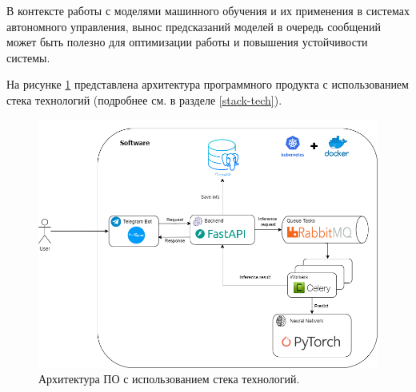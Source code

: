 \documentclass[a4paper,12pt]{extarticle}
\begin{document}
В контексте работы с моделями машинного обучения и их применения в системах автономного управления, вынос предсказаний моделей в очередь сообщений может быть полезно для оптимизации работы и повышения устойчивости системы.

На рисунке \ref{fig:app-arch} представлена архитектура программного продукта с использованием стека технологий (подробнее см. в разделе \ref{stack-tech}).

\begin{figure}[ht]
	\centering
	\includegraphics[scale=0.5]{app-arch.png}
	\caption{Архитектура ПО с использованием стека технологий.}
	\label{fig:app-arch}
\end{figure}
\end{document}
